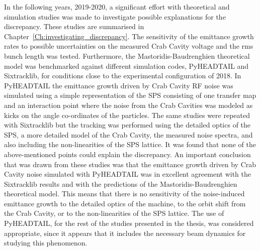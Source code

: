 In the following years, 2019-2020, a significant effort with theoretical and simulation studies was made to investigate possible explanations for the discrepancy. These studies are summarised in Chapter~\ref{Ch:investigating_discrepancy}. The sensitivity of the emittance growth rates to possible uncertainties on the measured Crab Cavity voltage and the rms bunch length was tested. Furthermore, the Mastoridis-Baudrenghien theoretical model was benchmarked against different simulation codes, PyHEADTAIL and Sixtracklib, for conditions close to the experimental configuration of 2018. In PyHEADTAIL the emittance growth driven by Crab Cavity RF noise was simulated using a simple representation of the SPS consisting of one transfer map and an interaction point where the noise from the Crab Cavities was modeled as kicks on the angle co-ordinates of the particles. The same studies were repeated with Sixtracklib but the tracking was performed using the detailed optics of the SPS, a more detailed model of the Crab Cavity, the measured noise spectra, and also including the non-linearities of the SPS lattice. It was found that none of the above-mentioned points could explain the discrepancy. An important conclusion that was drawn from these studies was that the emittance growth driven by Crab Cavity noise simulated with PyHEADTAIL was in excellent agreement with the Sixtracklib results and with the predictions of the Mastoridis-Baudrenghien theoretical model. This means that there is no sensitivity of the noise-induced emittance growth to the detailed optics of the machine, to the orbit shift from the Crab Cavity, or to the non-linearities of the SPS lattice. The use of PyHEADTAIL, for the rest of the studies presented in the thesis, was considered appropriate, since it appears that it includes the necessary beam dynamics for studying this phenomenon.

